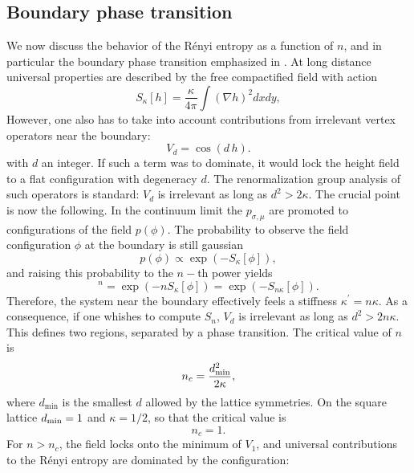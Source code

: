 \documentclass[11pt]{iopart}
\begin{document}
\subsection{Boundary phase transition}
\label{sec:bpt}
We now discuss the behavior of the R\'enyi entropy as a function of $n$, and in particular the boundary phase transition emphasized in \cite{Stephan2011}. At long distance universal properties are described by the free compactified field with action
 \begin{equation}\label{eq:free_field_bis}
  S_\kappa[h]=\frac{\kappa}{4\pi}\int \left(\nabla h\right)^2 dx dy,
 \end{equation}
However, one also has to take into account contributions from irrelevant vertex operators near the boundary:
\begin{equation}
 V_d=\cos \left(d \,h\right).
\end{equation}
with $d$ an integer. If such a term was to dominate, it would lock the height field to a flat configuration with degeneracy $d$. The renormalization group analysis of such operators is standard\cite{Coleman}: $V_d$ is irrelevant as long as $d^2>2\kappa$. The crucial point is now the following.  
In the continuum limit the $p_{\sigma,\mu}$ are promoted to configurations of the field $p(\phi)$. The probability to observe the field configuration $\phi$ at the boundary is still gaussian
\begin{equation}
 p(\phi)\propto \exp(-S_{\kappa}[\phi]),
\end{equation}
and raising this probability to the $n-$th power yields
\begin{equation}
 [p(\phi)]^n=\exp(-n S_{\kappa}[\phi])=\exp(-S_{n\kappa}[\phi]).
\end{equation}
Therefore, the system near the boundary effectively feels a stiffness $\kappa^\prime=n\kappa$. As a consequence, if one whishes to compute $S_n$, $V_d$ is irrelevant as long as $d^2>2n\kappa$. This defines two regions, separated by a phase transition. The critical value of $n$ is
\begin{equation}
 n_c=\frac{d_{\rm min}^2}{2\kappa},
\end{equation}
where $d_{\min}$ is the smallest $d$ allowed by the lattice symmetries. On the square lattice $d_{\rm min}=1$ and $\kappa=1/2$, so that the critical value is
\begin{equation}
 n_c=1.
\end{equation}
For $n>n_c$, the field locks onto the minimum of $V_{1}$, and universal contributions to the R\'enyi entropy are dominated by the configuration:
\end{document}
